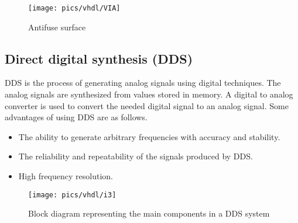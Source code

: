 \pagebreak

\begin{figure}[!h]
	\centering
	\texttt{[image: pics/vhdl/VIA]}
	\caption{Antifuse surface}
	\label{fig:via}
\end{figure}

\subsection{Direct digital synthesis (DDS)}

\noindent
DDS is the process of generating analog signals using digital techniques. The analog signals are synthesized from values stored in memory. A digital to analog converter is used to convert the needed digital signal to an analog signal. Some advantages of using DDS are as follows.
\begin{itemize}
	\item  The ability to generate arbitrary frequencies with accuracy and stability.
	\item  The reliability and repeatability of the signals produced by DDS.
	\item High frequency resolution.
\end{itemize}

\begin{figure}[!h]
	\centering
	\texttt{[image: pics/vhdl/i3]}
	\caption{Block diagram representing the main components in a DDS system}
	\label{fig:i3}
\end{figure}


\pagebreak